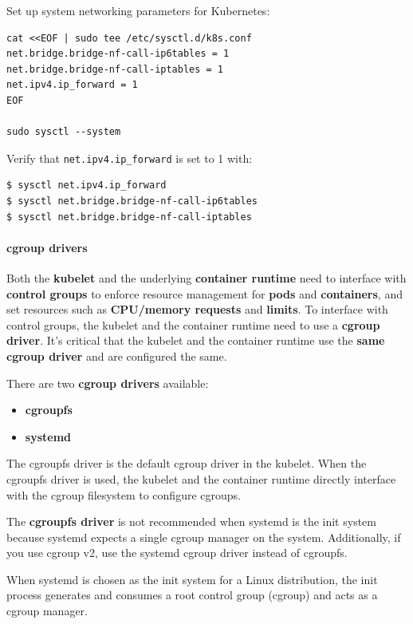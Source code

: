 \documentclass{article}
\newenvironment{codetemplate}[1][]{%
  \mybasecolorbox[#1]
  \itshape
}{%
  \endmybasecolorbox
}
\begin{document}
Set up system networking parameters for Kubernetes:
\begin{codetemplate}{}
\begin{verbatim}
cat <<EOF | sudo tee /etc/sysctl.d/k8s.conf
net.bridge.bridge-nf-call-ip6tables = 1
net.bridge.bridge-nf-call-iptables = 1
net.ipv4.ip_forward = 1
EOF

sudo sysctl --system
\end{verbatim}
\end{codetemplate}

Verify that \verb|net.ipv4.ip_forward| is set to 1 with:
\begin{codetemplate}{}
\begin{verbatim}
$ sysctl net.ipv4.ip_forward
$ sysctl net.bridge.bridge-nf-call-ip6tables
$ sysctl net.bridge.bridge-nf-call-iptables
\end{verbatim}
\end{codetemplate}

\paragraph{cgroup drivers}
Both the \textbf{kubelet} and the underlying \textbf{container runtime} need to interface with \textbf{control groups} to enforce resource management for \textbf{pods} and \textbf{containers}, and set resources such as \textbf{CPU/memory requests} and \textbf{limits}. To interface with control groups, the kubelet and the container runtime need to use a \textbf{cgroup driver}. It's critical that the kubelet and the container runtime use the \textbf{same cgroup driver} and are configured the same.

There are two \textbf{cgroup drivers} available:
\begin{itemize}
    \item \textbf{cgroupfs}
    \item \textbf{systemd}
\end{itemize}

The cgroupfs driver is the default cgroup driver in the kubelet. When the cgroupfs driver is used, the kubelet and the container runtime directly interface with the cgroup filesystem to configure cgroups.

The \textbf{cgroupfs driver} is not recommended when systemd is the init system because systemd expects a single cgroup manager on the system. Additionally, if you use cgroup v2, use the systemd cgroup driver instead of cgroupfs.

When systemd is chosen as the init system for a Linux distribution, the init process generates and consumes a root control group (cgroup) and acts as a cgroup manager.
\end{document}
